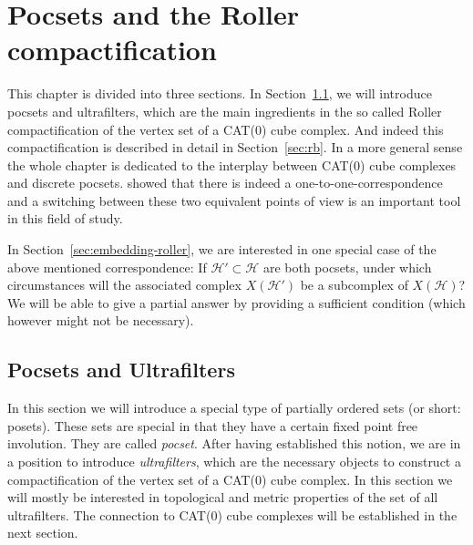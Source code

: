 \section{Pocsets and the Roller compactification}
\label{sec:roller}

This chapter is divided into three sections. In Section~\ref{sec:pocset}, we will introduce pocsets and ultrafilters, which are the main ingredients in the so called Roller compactification of the vertex set of a CAT(0) cube complex. And indeed this compactification is described in detail in Section~\ref{sec:rb}. In a more general sense the whole chapter is dedicated to the interplay between CAT(0) cube complexes and discrete pocsets. \textcite{Roller1999} showed that there is indeed a one-to-one-correspondence and a switching between these two equivalent points of view is an important tool in this field of study.

In Section~\ref{sec:embedding-roller}, we are interested in one special case of the above mentioned correspondence: If \(\mathcal{H'} \subset \mathcal{H}\) are both pocsets, under which circumstances will the associated complex \(X(\mathcal{H}')\) be a subcomplex of \(X(\mathcal{H})\)? We will be able to give a partial answer by providing a sufficient condition (which however might not be necessary).

\subsection{Pocsets and Ultrafilters}
\label{sec:pocset}

In this section we will introduce a special type of partially ordered sets (or short: posets). These sets are special in that they have a certain fixed point free involution. They are called \emph{pocset}. After having established this notion, we are in a position to introduce \emph{ultrafilters}, which are the necessary objects to construct a compactification of the vertex set of a CAT(0) cube complex. In this section we will mostly be interested in topological and metric properties of the set of all ultrafilters. The connection to CAT(0) cube complexes will be established in the next section.

